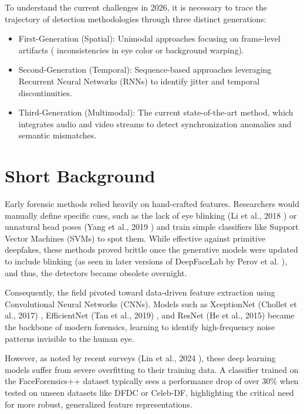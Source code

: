 \documentclass[12pt,a4paper]{report}
\begin{document}
To understand the current challenges in 2026, it is necessary to trace the trajectory of detection methodologies through three distinct generations:
\begin{itemize}
    \item First-Generation (Spatial): Unimodal approaches focusing on frame-level artifacts ( inconsistencies in eye color or background warping).
    \item Second-Generation (Temporal): Sequence-based approaches leveraging Recurrent Neural Networks (RNNs) to identify jitter and temporal discontinuities.
    \item Third-Generation (Multimodal): The current state-of-the-art method, which integrates audio and video streams to detect synchronization anomalies and semantic mismatches.
\end{itemize}

\section{Short Background}
Early forensic methods relied heavily on hand-crafted features. Researchers would manually define specific cues, such as the lack of eye blinking (Li et al., 2018 \cite{li2018exposing}) or unnatural head poses (Yang et al., 2019 \cite{yang2019exposing}) and train simple classifiers like Support Vector Machines (SVMs) to spot them. While effective against primitive deepfakes, these methods proved brittle once the generative models were updated to include blinking (as seen in later versions of DeepFaceLab by Perov et al. \cite{perov2020deepfacelab}), and thus, the detectors became obsolete overnight.

\pagebreak

Consequently, the field pivoted toward data-driven feature extraction using Convolutional Neural Networks (CNNs). Models such as XceptionNet (Chollet et al., 2017) \cite{chollet2017xception}, EfficientNet (Tan et al., 2019) \cite{tan2019efficientnet}, and ResNet (He et al., 2015) \cite{he2015deepresiduallearningimage} became the backbone of modern forensics, learning to identify high-frequency noise patterns invisible to the human eye.

However, as noted by recent surveys (Lin et al., 2024 \cite{lin2024detecting}), these deep learning models suffer from severe overfitting to their training data. A classifier trained on the FaceForensics++ dataset typically sees a performance drop of over 30\% when tested on unseen datasets like DFDC or Celeb-DF, highlighting the critical need for more robust, generalized feature representations.
\end{document}
